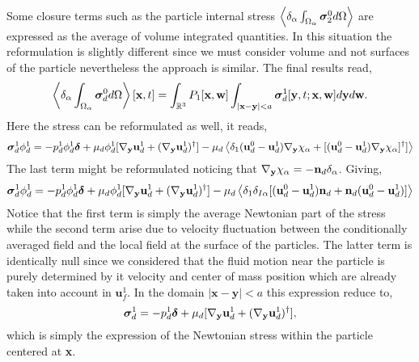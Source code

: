 Some closure terms such as the particle internal stress $\left<\delta_\alpha \int_{\Omega_{\alpha}} \bm{\sigma}_2^0 d\Omega\right>$ are expressed as the average of volume integrated quantities. 
In this situation the reformulation is slightly different since we must consider volume and not surfaces of the particle nevertheless the approach is similar. 
The final results read, 
\begin{equation}
    \left<\delta_\alpha \int_{\Omega_{\alpha}} \bm\sigma_d^0 d\Omega\right>[\textbf{x},t]
    =
    \int_{\mathbb{R}^3}
    P_1[\textbf{x},\textbf{w}]
    \int_{|\textbf{x}-\textbf{y}|<a}
    \bm\sigma_d^1[\textbf{y},t;\textbf{x},\textbf{w}] 
    d\textbf{y}
    d\textbf{w}. 
    \label{eq:conditionally_averaged_vol}
\end{equation}
Here the stress can be reformulated as well, it reads, 
\begin{equation*}
    \bm\sigma_d^1\phi_d^1  
    = 
    -p_d^1 \phi_d^1  \bm\delta
    + \mu_d 
    \phi_d^1 
     [{\mathbf{\nabla}_\textbf{y}} \textbf{u}^1_d+({\mathbf{\nabla}_\textbf{y}}  \textbf{u}^1_d)^\dagger]
     - \mu_d
     \left<
         \delta_1
         (\textbf{u}_d^0 - \textbf{u}_d^1)
         {\mathbf{\nabla}_\textbf{y}}  \chi_{\alpha}
         + 
         [(\textbf{u}_d^0 - \textbf{u}_d^1)
            {\mathbf{\nabla}_\textbf{y}}  \chi_{\alpha}]^\dagger
         ]
         \right>
\end{equation*}
The last term might be reformulated noticing that ${\mathbf{\nabla}_\textbf{y}}  \chi_\alpha = - \textbf{n}_d \delta_{\alpha}$. 
Giving, 
\begin{equation*}
    \bm\sigma_d^1\phi_d^1  
    = 
    -p_d^1 \phi_d^1  \bm\delta
    + \mu_d \phi_d^1 [{\mathbf{\nabla}_\textbf{y}} \textbf{u}^1_d+({\mathbf{\nabla}_\textbf{y}}  \textbf{u}^1_d)^\dagger]
     - \mu_d
     \left<
         \delta_1
         \delta_{I\alpha}
         [(\textbf{u}_d^0 - \textbf{u}_d^1) \textbf{n}_d 
         + \textbf{n}_d (\textbf{u}_d^0 - \textbf{u}_d^1)]
         \right>
\end{equation*}
Notice that the first term is simply the average Newtonian part of the stress while the second term arise due to velocity fluctuation between the conditionally averaged field and the local field at the surface of the particles. 
The latter term is identically null since we considered that the fluid motion near the particle is purely determined by it velocity and center of mass position which are already taken into account in $\textbf{u}_f^1$. 
In the domain $|\textbf{x} - \textbf{y}| < a$ this expression reduce to, 
\begin{equation*}
    \bm\sigma_d^1  
    = 
    -p_d^1   \bm\delta
    + \mu_d  [{\mathbf{\nabla}_\textbf{y}} \textbf{u}^1_d+({\mathbf{\nabla}_\textbf{y}}  \textbf{u}^1_d)^\dagger],
\end{equation*}
which is simply the expression of the Newtonian stress within the particle centered at \textbf{x}. 

